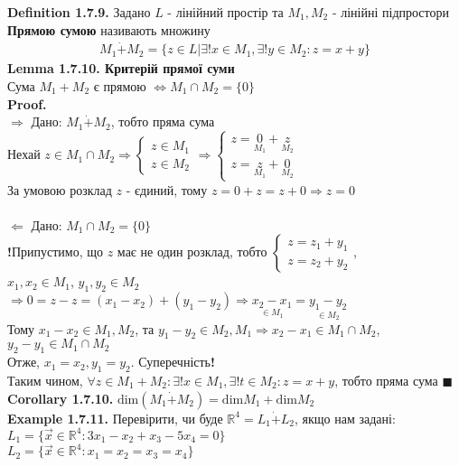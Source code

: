 \documentclass[a4paper, 14pt]{extarticle}
\def\defin#1{\textbf{Definition {#1}}}
\def\ex#1{\textbf{Example {#1}}}
\def\lm#1{\textbf{Lemma {#1}}}
\def\crl#1{\textbf{Corollary {#1}}}
\def\proof{\textbf{Proof.}\\}
\def\bigline{\vspace{5mm}\\}
\def\qed{$\blacksquare$}
\def\dim#1{\textrm{dim} {#1}}
\begin{document}
	
	\defin{1.7.9.} Задано $L$ - лінійний простір та $M_1, M_2$ - лінійні підпростори\\
	\textbf{Прямою сумою} називають множину
	\begin{align*}
	M_1 \dot{+} M_2 = \{z \in L | \exists! x \in M_1, \exists! y \in M_2: z = x+y\}
	\end{align*}
	\lm{1.7.10. Критерій прямої суми} \\
	Сума $M_1 + M_2$ є прямою $\iff M_1 \cap M_2 = \{0\}$\\
	\proof
	$\boxed{\Rightarrow}$ Дано: $M_1 \dot{+} M_2$, тобто пряма сума\\
	Нехай $z \in M_1 \cap M_2 \Rightarrow \begin{cases} z \in M_1 \\ z \in M_2 \end{cases} \Rightarrow \begin{cases} z = \underset{M_1}{0} + \underset{M_2}{z} \\ z = \underset{M_1}{z} + \underset{M_2}{0} \end{cases}$\\
	За умовою розклад $z$ - єдиний, тому $z=0+z=z+0 \Rightarrow z = 0$\\
	\\
	$\boxed{\Leftarrow}$ Дано: $M_1 \cap M_2 = \{0\}$\\
	\textbf{!}Припустимо, що $z$ має не один розклад, тобто $\begin{cases} z = z_1 + y_1 \\ z = z_2 + y_2 \end{cases}$,\\ $x_1,x_2 \in M_1$, $y_1,y_2 \in M_2$\\
	$\Rightarrow 0 = z-z=(x_1-x_2)+(y_1-y_2) \Rightarrow \underset{\in M_1}{x_2-x_1}=\underset{\in M_2}{y_1-y_2}$\\
	Тому $x_1-x_2 \in M_1, M_2$, та $y_1-y_2 \in M_2, M_1 \Rightarrow x_2-x_1 \in M_1 \cap M_2$, $y_2 - y_1 \in M_1 \cap M_2$\\
	Отже, $x_1 = x_2, y_1 = y_2$. Суперечність\textbf{!} \\
	Таким чином, $\forall z \in M_1 + M_2: \exists! x \in M_1, \exists! t \in M_2: z = x+y$, тобто пряма сума \qed
	\bigline
	\crl{1.7.10.} $\dim{(M_1 \dot{+} M_2)} = \dim{M_1} + \dim{M_2}$
	\bigline
	\ex{1.7.11.} Перевірити, чи буде $\mathbb{R}^4 = L_1 \dot{+} L_2$, якщо нам задані:\\
	$L_1 = \{\vec{x} \in \mathbb{R}^4: 3x_1 - x_2 + x_3 - 5x_4 = 0\}$\\
	$L_2 = \{\vec{x} \in \mathbb{R}^4: x_1 = x_2 = x_3 = x_4\}$\\
\end{document}
